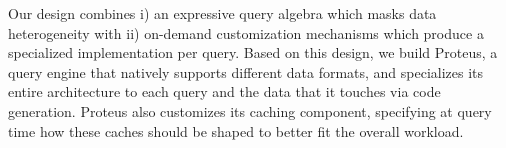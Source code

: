 Our design combines i) an expressive query algebra which masks data 
heterogeneity with ii) on-demand customization mechanisms which produce a specialized
implementation per query. Based on this design, we build Proteus,
a query engine that natively supports different data formats, and specializes 
its entire architecture to each query and the data that it touches 
via code generation. Proteus also customizes
its caching component, specifying at query time how these caches
should be shaped to better fit the overall workload.

